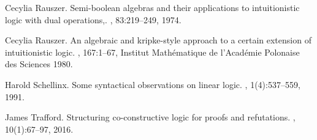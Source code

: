 \documentclass{lmcs}
\begin{document}
\begin{thebibliography}{10}
Cecylia Rauszer.
\newblock Semi-boolean algebras and their applications to intuitionistic logic
  with dual operations,.
, 83:219--249, 1974.

Cecylia Rauszer.
\newblock An algebraic and kripke-style approach to a certain extension of
  intuitionistic logic.
, 167:1--67, Institut
  Math{\'e}matique de l'Acad{\'e}mie Polonaise des Sciences 1980.

Harold Schellinx.
\newblock Some syntactical observations on linear logic.
, 1(4):537--559, 1991.

James Trafford.
\newblock Structuring co-constructive logic for proofs and refutations.
, 10(1):67--97, 2016.

\end{thebibliography}


\appendix
\end{document}
